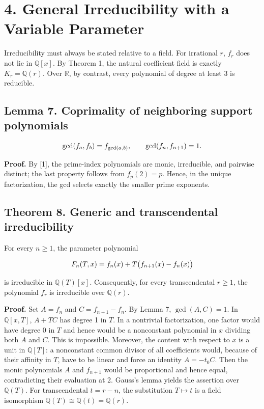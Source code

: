 \documentclass[11pt,a4paper]{article}
\newcommand{\fitmath}[1]{\begingroup\setbox0=\hbox{$\displaystyle #1$}\ifdim\wd0>\linewidth\resizebox{\linewidth}{!}{\box0}\else\box0\fi\endgroup}
\begin{document}
\section*{4. General Irreducibility with a Variable Parameter}

Irreducibility must always be stated relative to a field. For irrational $r$, $f_r$ does not lie in $\mathbb Q[x]$. By Theorem 1, the natural coefficient field is exactly $K_r=\mathbb Q(r)$. Over $\mathbb R$, by contrast, every polynomial of degree at least 3 is reducible.


\subsection*{Lemma 7. Coprimality of neighboring support polynomials}

\[
\fitmath{\gcd(f_a,f_b)=f_{\gcd(a,b)},\qquad\gcd(f_n,f_{n+1})=1.}
\]


\textbf{Proof.} By [1], the prime-index polynomials are monic, irreducible, and pairwise distinct; the last property follows from $f_p(2)=p$. Hence, in the unique factorization, the gcd selects exactly the smaller prime exponents.


\subsection*{Theorem 8. Generic and transcendental irreducibility}

For every $n\geq1$, the parameter polynomial


\[
\fitmath{F_n(T,x)=f_n(x)+T\bigl(f_{n+1}(x)-f_n(x)\bigr)}
\]


is irreducible in $\mathbb Q(T)[x]$. Consequently, for every transcendental $r\geq1$, the polynomial $f_r$ is irreducible over $\mathbb Q(r)$.


\textbf{Proof.} Set $A=f_n$ and $C=f_{n+1}-f_n$. By Lemma 7, $\gcd(A,C)=1$. In $\mathbb Q[x,T]$, $A+TC$ has degree 1 in $T$. In a nontrivial factorization, one factor would have degree 0 in $T$ and hence would be a nonconstant polynomial in $x$ dividing both $A$ and $C$. This is impossible. Moreover, the content with respect to $x$ is a unit in $\mathbb Q[T]$: a nonconstant common divisor of all coefficients would, because of their affinity in $T$, have to be linear and force an identity $A=-t_0C$. Then the monic polynomials $A$ and $f_{n+1}$ would be proportional and hence equal, contradicting their evaluation at 2. Gauss's lemma yields the assertion over $\mathbb Q(T)$. For transcendental $t=r-n$, the substitution $T\mapsto t$ is a field isomorphism $\mathbb Q(T)\cong\mathbb Q(t)=\mathbb Q(r)$.
\end{document}

